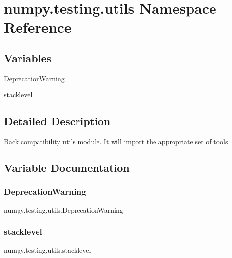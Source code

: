 \hypertarget{namespacenumpy_1_1testing_1_1utils}{}\section{numpy.\+testing.\+utils Namespace Reference}
\label{namespacenumpy_1_1testing_1_1utils}
\subsection*{Variables}
\begin{DoxyCompactItemize}
\item 
\hyperlink{namespacenumpy_1_1testing_1_1utils_aaa6fc18a4d3b8b459d0f0f539173c449}{Deprecation\+Warning}
\item 
\hyperlink{namespacenumpy_1_1testing_1_1utils_a698db5ea94481037c29918c20f12658e}{stacklevel}
\end{DoxyCompactItemize}


\subsection{Detailed Description}
\begin{DoxyVerb}Back compatibility utils module. It will import the appropriate
set of tools\end{DoxyVerb}
 

\subsection{Variable Documentation}
\mbox{\label{namespacenumpy_1_1testing_1_1utils_aaa6fc18a4d3b8b459d0f0f539173c449}} 
\subsubsection{\texorpdfstring{Deprecation\+Warning}{DeprecationWarning}}
{\footnotesize\ttfamily numpy.\+testing.\+utils.\+Deprecation\+Warning}

\mbox{\label{namespacenumpy_1_1testing_1_1utils_a698db5ea94481037c29918c20f12658e}} 
\subsubsection{\texorpdfstring{stacklevel}{stacklevel}}
{\footnotesize\ttfamily numpy.\+testing.\+utils.\+stacklevel}

